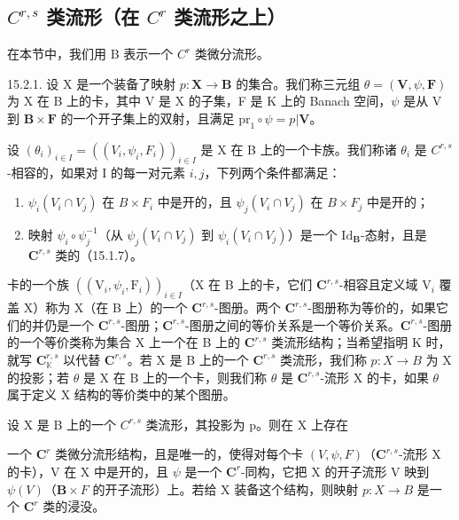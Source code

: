 \subsection{\texorpdfstring{\(C^{r,s}\) 类流形（在 \(C^{r}\) 类流形之上）}{C\^{}\{r,s\} 类流形（在 C\^{}\{r\} 类流形之上）}}

在本节中，我们用 B 表示一个 \(C^{r}\) 类微分流形。

15.2.1. 设 X 是一个装备了映射 \(p: \mathbf{X} \to \mathbf{B}\) 的集合。我们称三元组 \(\theta = (\mathbf{V}, \psi, \mathbf{F})\) 为 X 在 B 上的卡，其中 V 是 X 的子集，F 是 K 上的 Banach 空间，\(\psi\) 是从 V 到 \(\mathbf{B} \times \mathbf{F}\) 的一个开子集上的双射，且满足 \(\mathrm{pr}_1 \circ \psi = p|\mathbf{V}\)。

设 \((\theta_{i})_{i\in I} = ((V_{i},\psi_{i},F_{i}))_{i\in I}\) 是 X 在 B 上的一个卡族。我们称诸 \(\theta_{i}\) 是 \(C^{r,s}\)-相容的，如果对 I 的每一对元素 \(i,j\)，下列两个条件都满足：

\begin{enumerate}
\def\labelenumi{\alph{enumi})}
\item
  \(\psi_i(V_i \cap V_j)\) 在 \(B \times F_i\) 中是开的，且 \(\psi_j(V_i \cap V_j)\) 在 \(B \times F_j\) 中是开的；
\item
  映射 \(\psi_i\circ\psi_j^{-1}\)（从 \(\psi_j(V_i\cap V_j)\) 到 \(\psi_i(V_i\cap V_j)\)）是一个 \(\mathrm{Id}_{\mathbf{B}}\)-态射，且是 \(\mathbf{C}^{r,s}\) 类的（15.1.7）。
\end{enumerate}

卡的一个族 \(((\mathrm{V}_i,\psi_i,\mathrm{F}_i))_{i\in I}\)（X 在 B 上的卡，它们 \(\mathbf{C}^{r,s}\)-相容且定义域 \(\mathrm{V}_i\) 覆盖 X）称为 X（在 B 上）的一个 \(\mathbf{C}^{r,s}\)-图册。两个 \(\mathbf{C}^{r,s}\)-图册称为等价的，如果它们的并仍是一个 \(\mathbf{C}^{r,s}\)-图册；\(\mathbf{C}^{r,s}\)-图册之间的等价关系是一个等价关系。\(\mathbf{C}^{r,s}\)-图册的一个等价类称为集合 X 上一个在 B 上的 \(\mathbf{C}^{r,s}\) 类流形结构；当希望指明 K 时，就写 \(\mathbf{C}_{\mathbb{K}}^{r,s}\) 以代替 \(\mathbf{C}^{r,s}\)。若 X 是 B 上的一个 \(\mathbf{C}^{r,s}\) 类流形，我们称 \(p\colon X\to B\) 为 X 的投影；若 \(\theta\) 是 X 在 B 上的一个卡，则我们称 \(\theta\) 是 \(\mathbf{C}^{r,s}\)-流形 X 的卡，如果 \(\theta\) 属于定义 X 结构的等价类中的某个图册。

设 X 是 B 上的一个 \(C^{r,s}\) 类流形，其投影为 p。则在 X 上存在

一个 \(\mathbf{C}^{r}\) 类微分流形结构，且是唯一的，使得对每个卡 \((V,\psi,F)\)（\(\mathbf{C}^{r,s}\)-流形 X 的卡），V 在 X 中是开的，且 \(\psi\) 是一个 \(\mathbf{C}^{r}\)-同构，它把 X 的开子流形 V 映到 \(\psi(V)\)（\(\mathbf{B}\times F\) 的开子流形）上。若给 X 装备这个结构，则映射 \(p:X\to B\) 是一个 \(\mathbf{C}^{r}\) 类的浸没。

